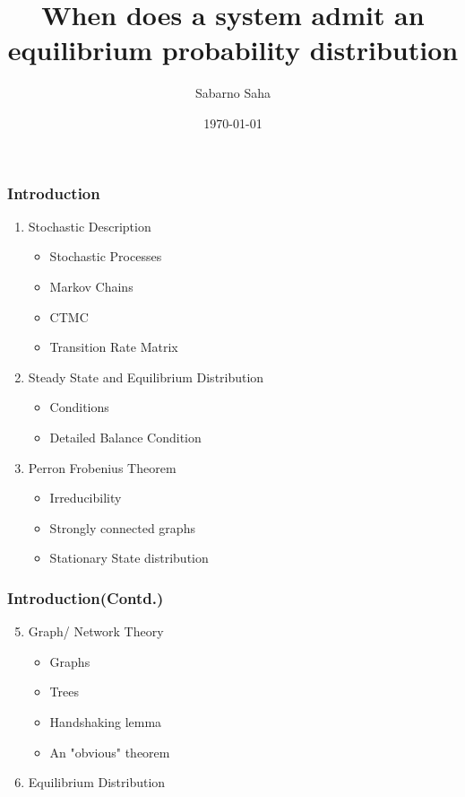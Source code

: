 \documentclass[9pt]{beamer}
\title{When does a system admit an equilibrium probability distribution}
\author[Sabarno Saha]{Sabarno Saha \inst{1} }
\institute[IISERK]{\inst{1} Department of Physical Sciences IISERK}
\date{\today}
\begin{document}
\frame{\titlepage}

\begin{frame}
  \frametitle{Introduction}
  \begin{enumerate}
    \item Stochastic Description
      \begin{itemize}
        \item Stochastic Processes
        \item Markov Chains
        \item CTMC 
        \item Transition Rate Matrix
      \end{itemize}
    \item Steady State and Equilibrium Distribution
      \begin{itemize}
        \item Conditions
        \item Detailed Balance Condition
      \end{itemize}
    \item Perron Frobenius Theorem
      \begin{itemize}
        \item Irreducibility
        \item Strongly connected graphs
        \item Stationary State distribution
      \end{itemize}
  \end{enumerate}
\end{frame}

\begin{frame}
  \frametitle{Introduction(Contd.)}
  \begin{enumerate}\setcounter{enumi}{4}
    \item Graph/ Network Theory
      \begin{itemize}
        \item Graphs
        \item Trees
        \item Handshaking lemma
        \item An "obvious" theorem
      \end{itemize}
    \item Equilibrium Distribution
  \end{enumerate}

\end{frame}
\end{document}
